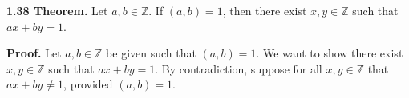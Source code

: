 \documentclass[12pt]{article}
\begin{document}
\noindent\textbf{1.38 Theorem.} Let $a,b\in\mathbb{Z}$. If $(a,b)=1$, then there exist $x,y\in\mathbb{Z}$ such that $ax+by=1$.

\bigskip

\noindent\textbf{Proof.} Let $a,b\in\mathbb{Z}$ be given such that $(a,b)=1$. We want to show there exist $x,y\in\mathbb{Z}$ such that $ax+by=1$. By contradiction, suppose for all $x,y\in\mathbb{Z}$ that $ax+by\not=1$, provided $(a,b)=1$.
\end{document}

